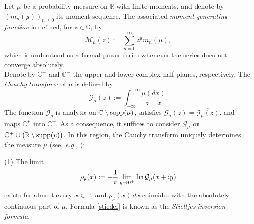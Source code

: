 \documentclass[12pt]{amsart}
\numberwithin{equation}{section}
\theoremstyle{definition}
\def\supp{\mathop{\rm supp}}
\def\Im{\mathop{\rm Im}}
\def\supp{\mathop{\rm supp}}
\begin{document}
\medskip

Let $\mu$ be a probability measure on $\mathbb{R}$ with finite moments, and denote by $(m_n(\mu))_{n\geq 0}$ its moment sequence. The associated \emph{moment generating function} is defined, for $z\in\mathbb{C}$, by
\[
\mathcal{M}_\mu(z):=\sum_{n=0}^{\infty} z^n m_n(\mu),
\]
which is understood as a formal power series whenever the series does not converge absolutely.\\
Denote by $\mathbb{C}^+$ and $\mathbb{C}^-$ the upper and lower complex half-planes, respectively. The \emph{Cauchy transform} of $\mu$ is defined by
\[
\mathcal{G}_{\mu}(z):=\int_{-\infty}^{+\infty}\frac{\mu(dx)}{z-x}.
\]
The function $\mathcal{G}_{\mu}$ is analytic on $\mathbb{C}\setminus\supp(\mu)$, satisfies $\mathcal{G}_{\mu}(\overline{z})=\overline{\mathcal{G}_{\mu}(z)}$, and maps $\mathbb{C}^+$ into $\mathbb{C}^-$. As a consequence, it suffices to consider $\mathcal{G}_{\mu}$ on $\mathbb{C}^+\cup\bigl(\mathbb{R}\setminus\supp(\mu)\bigr)$. In this region, the Cauchy transform uniquely determines the measure $\mu$ (see, \textit{e.g.}, \cite{HO}):

\medskip
\noindent
(1) The limit
\begin{equation}
\label{stiedef}
\rho_\mu(x):=-\frac{1}{\pi}\lim_{y\to 0^{+}}\Im \mathcal{G}_{\mu}(x+iy)
\end{equation}
exists for almost every $x\in\mathbb{R}$, and $\rho_\mu(x)\,dx$ coincides with the absolutely continuous part of $\mu$. Formula \eqref{stiedef} is known as the \emph{Stieltjes inversion formula}.
\end{document}
